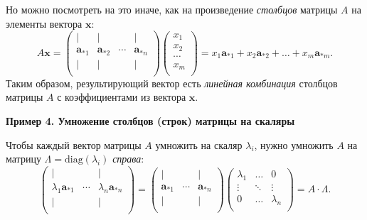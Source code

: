 \documentclass[11pt,a4paper]{article}
\begin{document}
Но можно посмотреть на это иначе, как на произведение \emph{столбцов}
матрицы \(A\) на элементы вектора \(\mathbf{x}\): \[
  A \mathbf{x} = 
  \begin{pmatrix}
     | & | & {} & | \\
     \mathbf{a}_{*1} & \mathbf{a}_{*2} & \cdots & \mathbf{a}_{*n} \\
     | & | & {} & | \\
  \end{pmatrix}
  \begin{pmatrix}
     x_1    \\
     x_2    \\
     \cdots \\
     x_m \\
  \end{pmatrix}
  = 
  x_1 \mathbf{a}_{*1} + x_2 \mathbf{a}_{*2} + \dots + x_m \mathbf{a}_{*m}.
\] Таким образом, результирующий вектор есть \emph{линейная комбинация}
столбцов матрицы \(A\) с коэффициентами из вектора \(\mathbf{x}\).

    \textbf{Пример 4. Умножение столбцов (строк) матрицы на скаляры}

Чтобы каждый вектор матрицы \(A\) умножить на скаляр \(\lambda_i\),
нужно умножить \(A\) на матрицу \(\Lambda = \mathrm{diag}(\lambda_i)\)
\emph{справа}: \[
  \begin{pmatrix}
    | & {} & | \\
    \lambda_1 \mathbf{a}_{*1} & \cdots & \lambda_n \mathbf{a}_{*n} \\
    | & {} & | \\
  \end{pmatrix}
  =
  \begin{pmatrix}
    | & {} & | \\
    \mathbf{a}_{*1} & \cdots & \mathbf{a}_{*n} \\
    | & {} & | \\
  \end{pmatrix}
  \begin{pmatrix}
    \lambda_{1} & \ldots & 0         \\
    \vdots      & \ddots & \vdots    \\
    0           & \ldots & \lambda_n \\
  \end{pmatrix}
  = A \cdot \Lambda.
\]
\end{document}
